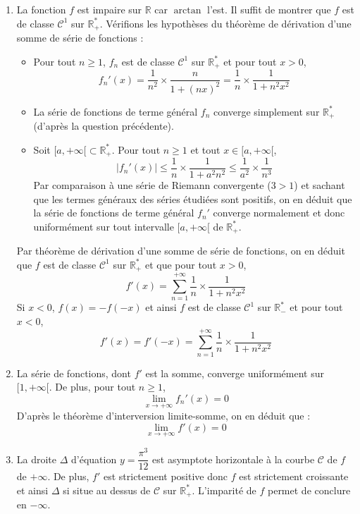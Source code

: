 \documentclass[a4paper,10pt]{report}
\begin{document}
\begin{enumerate}
\item La fonction $f$ est impaire sur $\mathbb{R}$ car $\arctan$ l'est. Il suffit de montrer que $f$ est de classe $\mathcal{C}^1$ sur $\mathbb{R}_+^{*}$. Vérifions les hypothèses du théorème de dérivation d'une somme de série de fonctions :
\begin{itemize}
\item Pour tout $n \geq 1$, $f_n$ est de classe $\mathcal{C}^1$ sur $\mathbb{R}_+^{*}$ et pour tout $x>0$,
$$ f_n'(x) = \dfrac{1}{n^2} \times \dfrac{n}{1+(nx)^2} = \dfrac{1}{n} \times \dfrac{1}{1+n^2x^2}$$
\item La série de fonctions de terme général $f_n$ converge simplement sur $\mathbb{R}_+^{*}$ (d'après la question précédente).
\item Soit $[a, + \infty[ \subset \mathbb{R}_+^{*}$. Pour tout $n \geq 1$ et tout $x \in [a, + \infty[$,
$$ \vert f_n'(x) \vert \leq \dfrac{1}{n} \times \dfrac{1}{1+a^2n^2} \leq \dfrac{1}{a^2} \times \dfrac{1}{n^3}$$
Par comparaison à une série de Riemann convergente ($3>1$) et sachant que les termes généraux des séries étudiées sont positifs, on en déduit que la série de fonctions de terme général $f_n'$ converge normalement et donc uniformément sur tout intervalle $[a,+ \infty[$ de $\mathbb{R}_+^{*}$.
\end{itemize}
Par théorème de dérivation d'une somme de série de fonctions, on en déduit que $f$ est de classe $\mathcal{C}^1$ sur $\mathbb{R}_+^{*}$ et que pour tout $x>0$,
$$ f'(x) = \sum_{n=1}^{+ \infty} \dfrac{1}{n} \times \dfrac{1}{1+n^2x^2}$$
Si $x<0$, $f(x)=-f(-x)$ et ainsi $f$ est de classe $\mathcal{C}^1$ sur $\mathbb{R}_{-}^*$ et pour tout $x<0$,
$$ f'(x)=f'(-x) = \sum_{n=1}^{+ \infty} \dfrac{1}{n} \times \dfrac{1}{1+n^2x^2}$$
\item La série de fonctions, dont $f'$ est la somme, converge uniformément sur $[1, + \infty[$. De plus, pour tout $n \geq 1$,
$$ \lim_{x \rightarrow + \infty} f_n'(x) = 0$$
D'après le théorème d'interversion limite-somme, on en déduit que :
$$ \lim_{x \rightarrow + \infty} f'(x) = 0$$
\item La droite $\Delta$ d'équation $y= \dfrac{\pi^3}{12}$ est asymptote horizontale à la courbe $\mathcal{C}$ de $f$ de $+ \infty$. De plus, $f'$ est strictement positive donc $f$ est strictement croissante et ainsi $\Delta$ si situe au dessus de $\mathcal{C}$ sur $\mathbb{R}_+^{*}$. L'imparité de $f$ permet de conclure en $- \infty$.
\end{enumerate}
\end{document}
